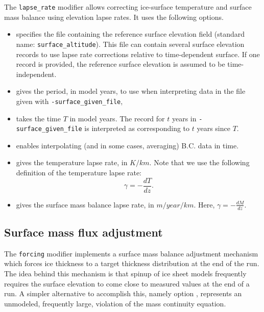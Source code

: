 \documentclass[titlepage,letterpaper,final]{scrartcl}
\begin{document}
The \texttt{lapse_rate} modifier allows correcting ice-surface temperature and
surface mass balance using elevation lapse rates. It uses the following
options.

\begin{itemize}
\item {} specifies the file containing the reference
  surface elevation field (standard name: \texttt{surface_altitude}). This file
  can contain several surface elevation records to use lapse rate corrections
  relative to time-dependent surface. If one record is provided, the reference
  surface elevation is assumed to be time-independent.
\item {} gives the period, in model years, to
  use when interpreting data in the file given with
  \texttt{-surface_given_file},
\item {} takes the time $T$ in model
  years. The record for $t$ years in \texttt{-surface_given_file} is
  interpreted as corresponding to $t$ years since $T$.
\item {} enables interpolating (and in
  some cases, averaging) B.C. data in time.
\item {} gives the temperature lapse rate, in
  $K/km$. Note that we use the following definition of the temperature lapse
  rate:
  \begin{displaymath}
    \gamma = -\frac{dT}{dz}.
  \end{displaymath}
\item {} gives the surface mass balance lapse rate,
  in $m/year/km$. Here, $\gamma=-\frac{dM}{dz}$.
\end{itemize}

\subsection{Surface mass flux adjustment}
\label{sec:smb-adjustment}

The \texttt{forcing} modifier implements a surface mass balance adjustment
mechanism which forces ice thickness to a target thickness distribution at the
end of the run. The idea behind this mechanism is that spinup of ice sheet
models frequently requires the surface elevation to come close to measured
values at the end of a run. A simpler alternative to accomplish this, namely
option , represents an unmodeled, frequently large,
violation of the mass continuity equation.
\end{document}
